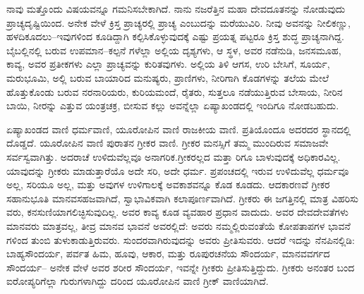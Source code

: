 ನಾವು ಮತ್ತೊಂದು ವಿಷಯವನ್ನೂ ಗಮನಿಸಬೇಕಾಗಿದೆ. ನಾನು ನಜರೆತ್ತಿನ ಮಹಾ ದೇವದೂತನನ್ನು ನೋಡುವುದು ಪ್ರಾಚ್ಯದೃಷ್ಟಿಯಿಂದ. ಅನೇಕ ವೇಳೆ ಕ್ರಿಸ್ತ ಪ್ರಾಚ್ಯರಲ್ಲಿ ಪ್ರಾಚ್ಯ ಎಂಬುದನ್ನು ಮರೆಯುವಿರಿ. ನೀವು ಅವನನ್ನು ನೀಲಿಕಣ್ಣು, ಹಳದಿಕೂದಲು–ಇವುಗಳಿಂದ ಕೂಡಿದ್ದಾಗಿ ಕಲ್ಪಿಸಿಕೊಳ್ಳುವುದಕ್ಕೆ ಎಷ್ಟು ಪ್ರಯತ್ನ ಪಟ್ಟರೂ ಕ್ರಿಸ್ತ ಶುದ್ಧ ಪ್ರಾಚ್ಯನಾಗಿದ್ದ. ಬೈಬಲ್ಲಿನಲ್ಲಿ ಬರುವ ಉಪಮಾನ–ಕಲ್ಪನೆ ಗಳೆಲ್ಲಾ ಅಲ್ಲಿಯ ದೃಶ್ಯಗಳು, ಆ ಸ್ಥಳ, ಅವರ ನಡೆನುಡಿ, ಜನಸಮೂಹ, ಕಾವ್ಯ, ಅವರ ಪ್ರತೀಕಗಳು ಎಲ್ಲಾ ಪ್ರಾಚ್ಯವನ್ನು ಕುರಿತವುಗಳು. ಅಲ್ಲಿಯ ತಿಳಿ ಆಗಸ, ಉರಿ ಬೇಸಿಗೆ, ಸೂರ್ಯ, ಮರುಭೂಮಿ, ಅಲ್ಲಿ ಬರುವ ಬಾಯಾರಿದ ಮನುಷ್ಯರು, ಪ್ರಾಣಿಗಳು, ನೀರಿಗಾಗಿ ಕೊಡಗಳನ್ನು ತಲೆಯ ಮೇಲೆ ಹೊತ್ತುಕೊಂಡು ಬರುವ ನರನಾರಿಯರು, ಕುರಿಯಮಂದೆ, ರೈತರು, ಸುತ್ತಲೂ ನಡೆಯುತ್ತಿರುವ ಬೇಸಾಯ, ನೀರಿನ ಬಾಯಿ, ನೀರನ್ನು ಎತ್ತುವ ಯಂತ್ರಚಕ್ರ, ಬೀಸುವ ಕಲ್ಲು ಅವನ್ನೆಲ್ಲಾ ಏಷ್ಯಾಖಂಡದಲ್ಲಿ ಇಂದಿಗೂ ನೋಡಬಹುದು.

ಏಷ್ಯಾಖಂಡದ ವಾಣಿ ಧರ್ಮವಾಣಿ, ಯೂರೋಪಿನ ವಾಣಿ ರಾಜಕೀಯ ವಾಣಿ. ಪ್ರತಿಯೊಂದೂ ಅದರದರ ಸ್ಥಾನದಲ್ಲಿ ದೊಡ್ಡದೆ. ಯೂರೋಪಿನ ವಾಣಿ ಪುರಾತನ ಗ್ರೀಕರ ವಾಣಿ. ಗ್ರೀಕರ ಮನಸ್ಸಿಗೆ ತಮ್ಮ ಮುಂದಿರುವ ಸಮಾಜವೇ ಸರ್ವಸ್ವವಾಗಿತ್ತು. ಅದರಾಚೆ ಉಳಿದುವೆಲ್ಲವೂ ಅನಾಗರಿಕ.ಗ್ರೀಕರಲ್ಲದ ಮತ್ತಾ ರಿಗೂ ಬಾಳುವುದಕ್ಕೆ ಅಧಿಕಾರವಿಲ್ಲ. ಯಾವುದನ್ನು ಗ್ರೀಕರು ಮಾಡುತ್ತಾರೆಯೊ ಅದೇ ಸರಿ, ಅದೇ ಧರ್ಮ. ಪ್ರಪಂಚದಲ್ಲಿ ಇರುವ ಉಳಿದುವೆಲ್ಲ ಧರ್ಮವೂ ಅಲ್ಲ, ಸರಿಯೂ ಅಲ್ಲ, ಮತ್ತು ಅವುಗಳ ಉಳಿಗಾಲಕ್ಕೆ ಅವಕಾಶವನ್ನೂ ಕೊಡ ಕೂಡದು. ಆದಕಾರಣವೆ ಗ್ರೀಕರ ಸಹಾನುಭೂತಿ ಮಾನವಸಹಜವಾಗಿದೆ, ಸ್ವಾಭಾವಿಕವಾಗಿ ಕಲಾಪೂರ್ಣವಾಗಿದೆ. ಗ್ರೀಕರು ಈ ಜಗತ್ತಿನಲ್ಲಿ ಮಾತ್ರ ವಿಹರಿಸು ವರು, ಕನಸುಣಿಯಾಗಲಿಚ್ಛಿಸುವುದಿಲ್ಲ. ಅವರ ಕಾವ್ಯ ಕೂಡ ವ್ಯವಹಾರ ಪ್ರಧಾನ ವಾದುದು. ಅವರ ದೇವದೇವತೆಗಳು ಮಾನವರು ಮಾತ್ರವಲ್ಲ, ತೀವ್ರ ಮಾನವ ಭಾವನೆ ಅವರಲ್ಲಿದೆ: ಅವರು ನಮ್ಮಲ್ಲಿರುವಂತೆಯೆ ಕೋಪತಾಪಗಳ ಭಾವನೆ ಗಳಿಂದ ತುಂಬಿ ತುಳುಕಾಡುತ್ತಿರುವರು. ಸುಂದರವಾಗಿರುವುದನ್ನು ಅವರು ಪ್ರೀತಿಸುವರು. ಆದರೆ ಇದನ್ನು ನೆನಪಿನಲ್ಲಿಡಿ: ಬಾಹ್ಯಸೌಂದರ್ಯ, ಪರ್ವತ ಹಿಮ, ಹೂವು, ಆಕಾರ, ಮತ್ತು ರೂಪುರಚನೆಯ ಸೌಂದರ್ಯ, ಮಾನವವರ್ಗದ ಸೌಂದರ್ಯ– ಅನೇಕ ವೇಳೆ ಅವರ ಶರೀರ ಸೌಂದರ್ಯ, ಇವನ್ನೇ ಗ್ರೀಕರು ಪ್ರೀತಿಸುತ್ತಿದ್ದುದು. ಗ್ರೀಕರು ಅನಂತರ ಬಂದ ಐರೋಪ್ಯರಿಗೆಲ್ಲಾ ಗುರುಗಳಾಗಿದ್ದು ದರಿಂದ ಯೂರೋಪಿನ ವಾಣಿ ಗ್ರೀಕ್​ ವಾಣಿಯಾಗಿದೆ.

